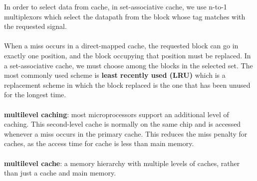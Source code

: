 \documentclass[letterpaper,c12pt]{article}
\begin{document}
 In order to select data from cache, in set-associative cache, we use n-to-1 multiplexors which select the datapath from the block whose tag matches with the requested signal.\\\\
 When a miss occurs in a direct-mapped cache, the requested block can go in exactly one position, and the block occupying that position must be replaced.  In a set-associative cache, we must choose among the blocks in the selected set. The most commonly used scheme is \textbf{least recently used (LRU)} which is a replacement scheme in which the block replaced is the one that has been unused for the longest time.\\\\
 \textbf{multilevel caching}: most microprocessors support an additional level of caching. This second-level cache is normally on the same chip and is accessed whenever a miss occurs in the primary cache. This reduces the miss penalty for caches, as the access time for cache is less than main memory.\\\\
 \textbf{multilevel cache}: a memory hierarchy with multiple levels of caches, rather than just a cache and main memory.
\end{document}
